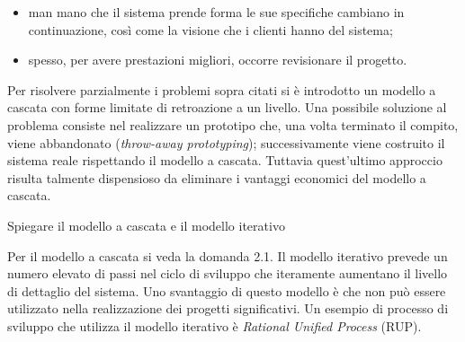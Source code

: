 \begin{solution}
\begin{itemize}
	\item man mano che il sistema prende forma le sue specifiche cambiano in continuazione, così come la visione che i clienti hanno del sistema;
	\item spesso, per avere prestazioni migliori, occorre revisionare il progetto.
\end{itemize}
Per risolvere parzialmente i problemi sopra citati si è introdotto un modello a cascata con forme limitate di retroazione a un livello.
Una possibile soluzione al problema consiste nel realizzare un prototipo che, una volta terminato il compito, viene abbandonato (\textit{throw-away prototyping}); successivamente viene costruito il sistema reale rispettando il modello a cascata.
\newline
Tuttavia quest'ultimo approccio risulta talmente dispensioso da eliminare i vantaggi economici del modello a cascata.
\end{solution}


\begin{problem}{2.2}
Spiegare il modello a cascata e il modello iterativo
\end{problem}
\begin{solution}
Per il modello a cascata si veda la domanda 2.1.
\newline
Il modello iterativo prevede un numero elevato di passi nel ciclo di sviluppo che iteramente aumentano il livello di dettaglio del sistema.
Uno svantaggio di questo modello è che non può essere utilizzato nella realizzazione dei progetti significativi.
Un esempio di processo di sviluppo che utilizza il modello iterativo è \textit{Rational Unified Process} (RUP).
\end{solution}


